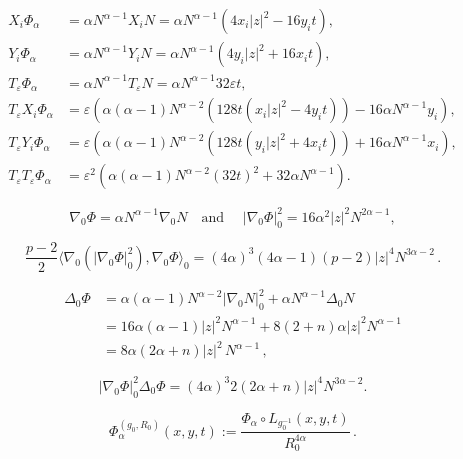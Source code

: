 \documentclass[10pt,a4paper]{amsart}
\newcommand{\eT}{T_{\eps}}
\newcommand{\eps}{\varepsilon}
\newcommand{\scal}[2]{\langle {#1},{#2}\rangle}
\begin{document}
\begin{align}
\label{XiPhi} X_i \Phi_{\alpha} &= \alpha N^{\alpha -1} X_i N = \alpha N^{\alpha-1} (4x_i |z|^2 - 16y_i t),\\
\label{YiPhi} Y_i \Phi_{\alpha} &= \alpha N^{\alpha -1} Y_i N = \alpha N^{\alpha-1} (4y_i |z|^2 + 16x_i t),\\
\label{TPhi} \eT \Phi_{\alpha} &= \alpha N^{\alpha -1} \eT N = \alpha N^{\alpha-1} 32 \eps t,\\
\eT X_i \Phi_{\alpha} &= \eps \left( \alpha (\alpha-1) N^{\alpha-2}(128 t (x_i |z|^2- 4y_i t)) - 16 \alpha N^{\alpha-1}y_i \right),\\
\eT Y_i \Phi_{\alpha} &= \eps \left( \alpha (\alpha-1) N^{\alpha-2}(128 t (y_i |z|^2+ 4x_i t)) + 16 \alpha N^{\alpha-1}x_i \right),\\
\label{TTPhi} \eT \eT \Phi_{\alpha} &= \eps^2 \left( \alpha (\alpha-1)N^{\alpha-2} (32t)^2 + 32 \alpha N^{\alpha-1}\right).
\end{align}

\begin{equation}
\label{nabla0Phi2}
\nabla_0 \Phi = \alpha N^{\alpha -1} \nabla_0 N \quad \textrm{and } \quad |\nabla_0 \Phi|_0^2 = 16 \alpha^2 |z|^2 N^{2\alpha -1} , 
\end{equation}

\begin{equation}
\label{firstpdec}
\frac{p-2}2\scal{\nabla_0\left( |\nabla_0 \Phi|_0^{2}\right)}{\nabla_0 \Phi}_0 = (4 \alpha)^3 (4\alpha-1) (p-2) |z|^4  N^{3\alpha -2} \, .
\end{equation}

\begin{equation}
\label{Delta0Phi}
\begin{aligned}
\Delta_0 \Phi &= \alpha (\alpha-1)N^{\alpha-2}|\nabla_0 N|_0^2 + \alpha N^{\alpha-1} \Delta_0 N \\
&= 16 \alpha (\alpha-1)|z|^2 N^{\alpha-1} + 8(2+n) \alpha |z|^2 N^{\alpha -1} \\
&= 8\alpha (2\alpha +n) |z|^2 \, N^{\alpha-1} \, , 
\end{aligned}
\end{equation}

\begin{equation}
\label{secondpdec}
|\nabla_0 \Phi|_0^{2}\Delta_0 \Phi = (4 \alpha)^{3}2  (2\alpha +n) |z|^4 N^{3\alpha-2}.
\end{equation}

\begin{equation}\label{PhiR0}
\Phi^{(g_0, R_0)}_{\alpha}(x,y,t):= \dfrac{\Phi_{\alpha} \circ L_{g_0^{-1}}(x,y,t)}{R_{0}^{4\alpha}} \, .
\end{equation}
\end{document}
